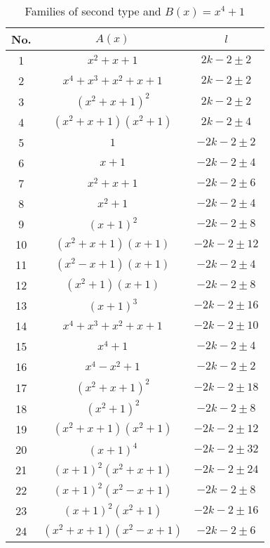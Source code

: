 \documentclass{amsart}
\begin{document}
\begin{table}[ht]
\caption{Families of second type and $B(x)=x^4+1$}
\centering
\begin{tabular}{|c |c |c |}
\hline
No. & $A(x)$ & $l$ \\
\hline
1 & $x^2+x+1$ & $2k-2\pm2$\\
2 & $x^4+x^3+x^2+x+1$ & $2k-2\pm2$ \\
3 & $(x^2+x+1)^2$ & $2k-2\pm2$\\
4 & $(x^2+x+1)(x^2+1)$ & $2k-2\pm4$\\
5 & $1$ & $-2k-2\pm2$\\
6 & $x+1$ & $-2k-2\pm4$\\
7 & $x^2+x+1$ & $-2k-2\pm6$\\
8 & $x^2+1$ & $-2k-2\pm4$\\
9 & $(x+1)^2$ & $-2k-2\pm8$\\
10 & $(x^2+x+1)(x+1)$ & $-2k-2\pm12$\\
11 & $(x^2-x+1)(x+1)$ & $-2k-2\pm4$\\
12 & $(x^2+1)(x+1)$ & $-2k-2\pm8$\\
13 & $(x+1)^3$ & $-2k-2\pm16$\\
14 & $x^4+x^3+x^2+x+1$ & $-2k-2\pm10$\\
15 & $x^4+1$ & $-2k-2\pm4$\\
16 & $x^4-x^2+1$ & $-2k-2\pm2$\\
17 & $(x^2+x+1)^2$ & $-2k-2\pm18$\\
18 & $(x^2+1)^2$ & $-2k-2\pm8$\\
19 & $(x^2+x+1)(x^2+1)$ & $-2k-2\pm12$\\
20 & $(x+1)^4$ & $-2k-2\pm32$\\
21 & $(x+1)^2(x^2+x+1)$ & $-2k-2\pm24$\\
22 & $(x+1)^2(x^2-x+1)$ & $-2k-2\pm8$\\
23 & $(x+1)^2(x^2+1)$ & $-2k-2\pm16$\\
24 & $(x^2+x+1)(x^2-x+1)$ & $-2k-2\pm6$\\
\hline
\end{tabular}
\end{table}
\end{document}
